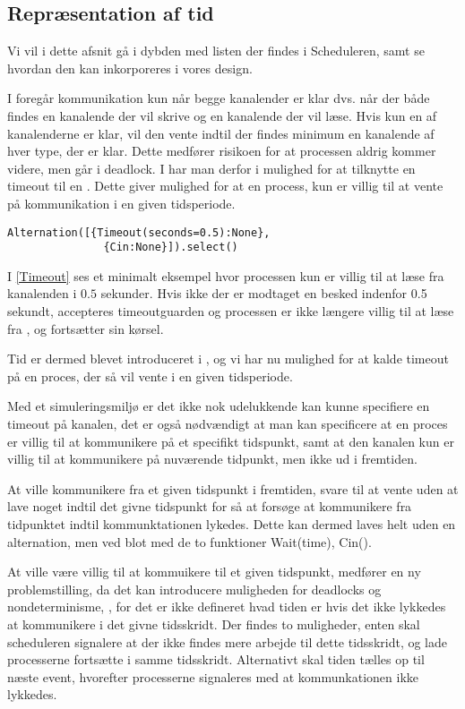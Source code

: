 \subsection{Repræsentation af tid}
Vi vil i dette afsnit gå i dybden med listen  der findes i Scheduleren, samt se hvordan den kan inkorporeres i vores design.

I \pycsp foregår kommunikation kun når begge kanalender er klar dvs.
når der både findes en kanalende der vil skrive og en kanalende der vil læse. 
Hvis kun en af kanalenderne er klar, vil den vente indtil
der findes minimum en kanalende af hver type, der er klar. Dette medfører risikoen for at processen aldrig kommer videre, men går i deadlock. I \pycsp har man derfor i  mulighed for at tilknytte en timeout til en . Dette
giver mulighed for at en process, kun er villig til at vente på kommunikation 
i en given tidsperiode. 
\begin{lstlisting}[float=hbtp, label=Timeout,
  caption=Timeout i Alternation (fra dokumentationen til PyCSP)]
  Alternation([{Timeout(seconds=0.5):None},
               {Cin:None}]).select()
\end{lstlisting} 

I \cref{Timeout} ses et minimalt eksempel hvor processen kun er villig til at læse fra kanalenden  i $0.5$ sekunder. Hvis ikke der er modtaget en besked indenfor 0.5 sekundt, accepteres timeoutguarden og processen er ikke længere villig til at læse fra , og fortsætter sin kørsel.


Tid er dermed blevet introduceret i \pycsp, og vi har nu mulighed for at kalde timeout på en proces, der så vil vente i en given tidsperiode.


Med et simuleringsmiljø er det ikke nok udelukkende kan kunne specifiere en 
timeout på kanalen, det er også nødvændigt at man kan specificere at en proces 
er villig til at kommunikere på et specifikt tidspunkt, samt at den kanalen 
kun er villig til at kommunikere på nuværende tidpunkt, men ikke ud 
i fremtiden.  

At ville kommunikere fra et given tidspunkt i fremtiden,  svare til at vente 
uden at lave noget indtil det givne tidspunkt for så at forsøge at kommunikere 
fra tidpunktet indtil kommunktationen lykedes. Dette kan dermed laves helt 
uden en alternation, men ved blot med de to funktioner Wait(time), Cin(). 

At ville være villig til at kommuikere til et given tidspunkt, medfører en ny 
problemstilling, da det kan introducere muligheden for deadlocks og 
nondeterminisme, , for det er ikke defineret hvad 
tiden er hvis det ikke lykkedes at kommunikere i det givne tidsskridt. Der 
findes to muligheder, enten skal scheduleren signalere at der ikke findes mere 
arbejde til dette tidsskridt, og lade processerne fortsætte i samme 
tidsskridt. Alternativt skal tiden tælles op til næste event, hvorefter 
processerne signaleres med at kommunkationen ikke lykkedes. 

